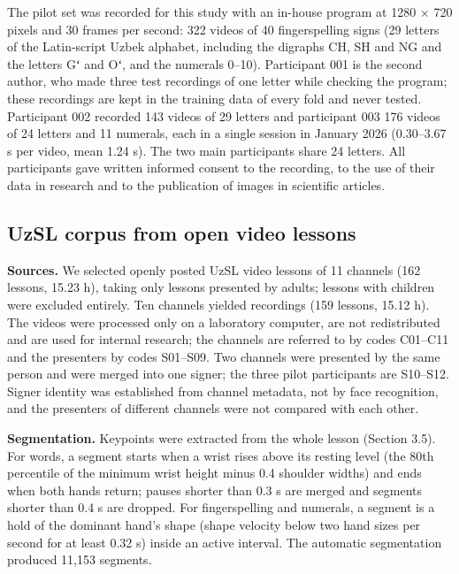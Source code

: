 The pilot set was recorded for this study with an in-house program at 1280 × 720 pixels and 30 frames per second: 322 videos of 40 fingerspelling signs (29 letters of the Latin-script Uzbek alphabet, including the digraphs CH, SH and NG and the letters Gʻ and Oʻ, and the numerals 0--10). Participant 001 is the second author, who made three test recordings of one letter while checking the program; these recordings are kept in the training data of every fold and never tested. Participant 002 recorded 143 videos of 29 letters and participant 003 176 videos of 24 letters and 11 numerals, each in a single session in January 2026 (0.30--3.67 s per video, mean 1.24 s). The two main participants share 24 letters. All participants gave written informed consent to the recording, to the use of their data in research and to the publication of images in scientific articles.

\hypertarget{uzsl-corpus-from-open-video-lessons}{%
\subsection{UzSL corpus from open video lessons}\label{uzsl-corpus-from-open-video-lessons}}

\textbf{Sources.} We selected openly posted UzSL video lessons of 11 channels (162 lessons, 15.23 h), taking only lessons presented by adults; lessons with children were excluded entirely. Ten channels yielded recordings (159 lessons, 15.12 h). The videos were processed only on a laboratory computer, are not redistributed and are used for internal research; the channels are referred to by codes C01--C11 and the presenters by codes S01--S09. Two channels were presented by the same person and were merged into one signer; the three pilot participants are S10--S12. Signer identity was established from channel metadata, not by face recognition, and the presenters of different channels were not compared with each other.

\textbf{Segmentation.} Keypoints were extracted from the whole lesson (Section 3.5). For words, a segment starts when a wrist rises above its resting level (the 80th percentile of the minimum wrist height minus 0.4 shoulder widths) and ends when both hands return; pauses shorter than 0.3 s are merged and segments shorter than 0.4 s are dropped. For fingerspelling and numerals, a segment is a hold of the dominant hand's shape (shape velocity below two hand sizes per second for at least 0.32 s) inside an active interval. The automatic segmentation produced 11,153 segments.

